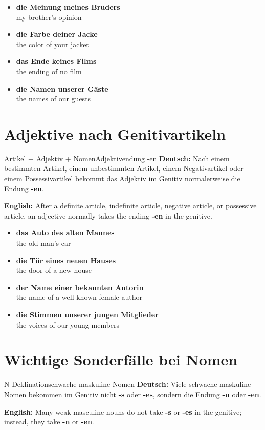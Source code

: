 \documentclass[a4paper,11pt]{article}
\newcommand{\GermanText}[1]{\textbf{Deutsch: }#1\par}
\newcommand{\EnglishText}[1]{{\small\color{SoftGray}\textbf{English: }#1\par}}
\newcommand{\ExampleItem}[2]{\item \textbf{#1}\\{\small\color{SoftGray}#2}}
\begin{document}
        \begin{exbox}
            \begin{itemize}
                \ExampleItem{die Meinung meines Bruders}{my brother's opinion}
                \ExampleItem{die Farbe deiner Jacke}{the color of your jacket}
                \ExampleItem{das Ende keines Films}{the ending of no film}
                \ExampleItem{die Namen unserer Gäste}{the names of our guests}
            \end{itemize}
        \end{exbox}

    \section{Adjektive nach Genitivartikeln}

        \begin{grammarentry}{Artikel + Adjektiv + Nomen}{Adjektivendung -en}
            \GermanText{Nach einem bestimmten Artikel, einem unbestimmten Artikel, einem Negativartikel oder einem Possessivartikel bekommt das Adjektiv im Genitiv normalerweise die Endung \textbf{-en}.}
            \EnglishText{After a definite article, indefinite article, negative article, or possessive article, an adjective normally takes the ending \textbf{-en} in the genitive.}
        \end{grammarentry}

        \begin{exbox}
            \begin{itemize}
                \ExampleItem{das Auto des alten Mannes}{the old man's car}
                \ExampleItem{die Tür eines neuen Hauses}{the door of a new house}
                \ExampleItem{der Name einer bekannten Autorin}{the name of a well-known female author}
                \ExampleItem{die Stimmen unserer jungen Mitglieder}{the voices of our young members}
            \end{itemize}
        \end{exbox}

    \section{Wichtige Sonderfälle bei Nomen}

        \begin{grammarentry}{N-Deklination}{schwache maskuline Nomen}
            \GermanText{Viele schwache maskuline Nomen bekommen im Genitiv nicht \textbf{-s} oder \textbf{-es}, sondern die Endung \textbf{-n} oder \textbf{-en}.}
            \EnglishText{Many weak masculine nouns do not take \textbf{-s} or \textbf{-es} in the genitive; instead, they take \textbf{-n} or \textbf{-en}.}
        \end{grammarentry}
\end{document}
